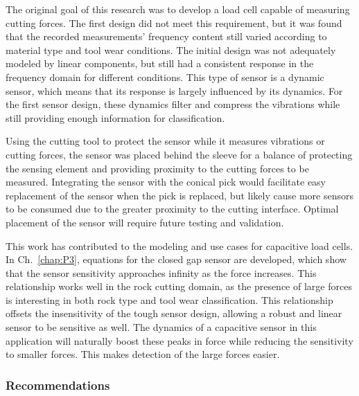 The original goal of this research was to develop a load cell capable of measuring cutting forces.
The first design did not meet this requirement, but it was found that the recorded measurements'
frequency content still varied according to material type and tool wear conditions.
The initial design was not adequately modeled by linear components, but still 
had a consistent response in the frequency domain for different conditions.
This type of sensor is a dynamic sensor, which means that its response
is largely influenced by its dynamics. For the first sensor design,
these dynamics filter and compress the vibrations while still providing enough information for classification.

Using the cutting tool to protect the sensor while it measures vibrations or cutting forces,
the sensor was placed behind the sleeve for a balance of protecting the sensing element 
and providing proximity to the cutting forces to be measured.
Integrating the sensor with the conical pick would facilitate easy replacement of the sensor when the pick is replaced,
but likely cause more sensors to be consumed due to the greater proximity to the cutting interface.
Optimal placement of the sensor will require future testing and validation.

This work has contributed to the modeling and use cases for capacitive load cells. 
In Ch.~\ref{chap:P3}, equations for the
closed gap sensor are developed, which show that the sensor sensitivity approaches infinity as the force increases.
This relationship works well in the rock cutting domain, as the presence of large forces is interesting
in both rock type and tool wear classification. 
This relationship offsets the insensitivity of the tough sensor design, 
allowing a robust and linear sensor to be sensitive as well.
The dynamics of a capacitive sensor in this application will 
naturally boost these peaks in force while reducing the sensitivity to smaller forces. This makes
detection of the large forces easier.

\subsubsection{Recommendations}

